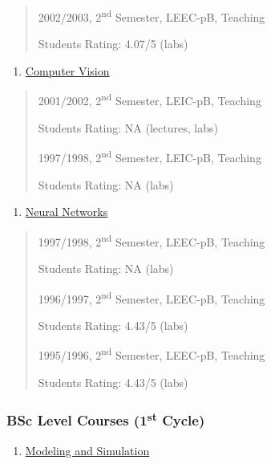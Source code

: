 \begin{quote}
2002/2003, 2\textsuperscript{nd} Semester, LEEC-pB, Teaching

Students Rating: 4.07/5 (labs)
\end{quote}

\begin{enumerate}
\def\labelenumi{\arabic{enumi}.}
\setcounter{enumi}{10}
\item
  \ul{Computer Vision}
\end{enumerate}

\begin{quote}
2001/2002, 2\textsuperscript{nd} Semester, LEIC-pB, Teaching

Students Rating: NA (lectures, labs)

1997/1998, 2\textsuperscript{nd} Semester, LEIC-pB, Teaching

Students Rating: NA (labs)
\end{quote}

\begin{enumerate}
\def\labelenumi{\arabic{enumi}.}
\setcounter{enumi}{11}
\item
  \ul{Neural Networks}
\end{enumerate}

\begin{quote}

1997/1998, 2\textsuperscript{nd} Semester, LEEC-pB, Teaching

Students Rating: NA (labs)

1996/1997, 2\textsuperscript{nd} Semester, LEEC-pB, Teaching

Students Rating: 4.43/5 (labs)

1995/1996, 2\textsuperscript{nd} Semester, LEEC-pB, Teaching

Students Rating: 4.43/5 (labs)

\end{quote}

\subsubsection{\texorpdfstring{BSc Level Courses (1\textsuperscript{st}
Cycle)}{BSc Level Courses (1st Cycle)}}\label{bsc-level-courses-1st-cycle}

\begin{enumerate}
\def\labelenumi{\arabic{enumi}.}
\setcounter{enumi}{12}
\item
  \ul{Modeling and Simulation}
\end{enumerate}

